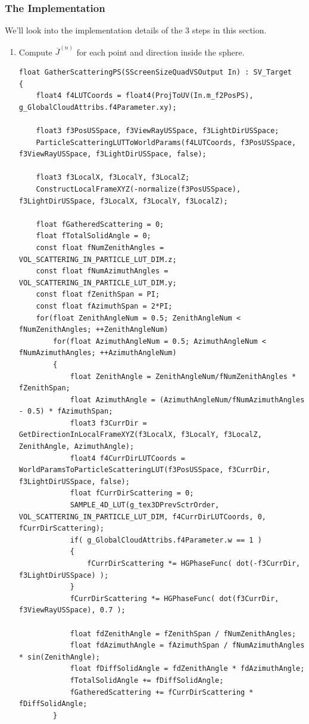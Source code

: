 \subsubsection{The Implementation}
We'll look into the implementation details of the 3 steps in this section.
\begin{enumerate}
\item Compute $\overline{J}^{(n)}$ for each point and direction inside the sphere.
\begin{lstlisting}
float GatherScatteringPS(SScreenSizeQuadVSOutput In) : SV_Target
{
    float4 f4LUTCoords = float4(ProjToUV(In.m_f2PosPS), g_GlobalCloudAttribs.f4Parameter.xy);

    float3 f3PosUSSpace, f3ViewRayUSSpace, f3LightDirUSSpace;
    ParticleScatteringLUTToWorldParams(f4LUTCoords, f3PosUSSpace, f3ViewRayUSSpace, f3LightDirUSSpace, false);

    float3 f3LocalX, f3LocalY, f3LocalZ;
    ConstructLocalFrameXYZ(-normalize(f3PosUSSpace), f3LightDirUSSpace, f3LocalX, f3LocalY, f3LocalZ);

    float fGatheredScattering = 0;
    float fTotalSolidAngle = 0;
    const float fNumZenithAngles = VOL_SCATTERING_IN_PARTICLE_LUT_DIM.z;
    const float fNumAzimuthAngles = VOL_SCATTERING_IN_PARTICLE_LUT_DIM.y;
    const float fZenithSpan = PI;
    const float fAzimuthSpan = 2*PI;
    for(float ZenithAngleNum = 0.5; ZenithAngleNum < fNumZenithAngles; ++ZenithAngleNum)
        for(float AzimuthAngleNum = 0.5; AzimuthAngleNum < fNumAzimuthAngles; ++AzimuthAngleNum)
        {
            float ZenithAngle = ZenithAngleNum/fNumZenithAngles * fZenithSpan;
            float AzimuthAngle = (AzimuthAngleNum/fNumAzimuthAngles - 0.5) * fAzimuthSpan;
            float3 f3CurrDir = GetDirectionInLocalFrameXYZ(f3LocalX, f3LocalY, f3LocalZ, ZenithAngle, AzimuthAngle);
            float4 f4CurrDirLUTCoords = WorldParamsToParticleScatteringLUT(f3PosUSSpace, f3CurrDir, f3LightDirUSSpace, false);
            float fCurrDirScattering = 0;
            SAMPLE_4D_LUT(g_tex3DPrevSctrOrder, VOL_SCATTERING_IN_PARTICLE_LUT_DIM, f4CurrDirLUTCoords, 0, fCurrDirScattering);
            if( g_GlobalCloudAttribs.f4Parameter.w == 1 )
            {
                fCurrDirScattering *= HGPhaseFunc( dot(-f3CurrDir, f3LightDirUSSpace) );
            }
            fCurrDirScattering *= HGPhaseFunc( dot(f3CurrDir, f3ViewRayUSSpace), 0.7 );

            float fdZenithAngle = fZenithSpan / fNumZenithAngles;
            float fdAzimuthAngle = fAzimuthSpan / fNumAzimuthAngles * sin(ZenithAngle);
            float fDiffSolidAngle = fdZenithAngle * fdAzimuthAngle;
            fTotalSolidAngle += fDiffSolidAngle;
            fGatheredScattering += fCurrDirScattering * fDiffSolidAngle;
        }
    

\end{lstlisting}
\end{enumerate}
